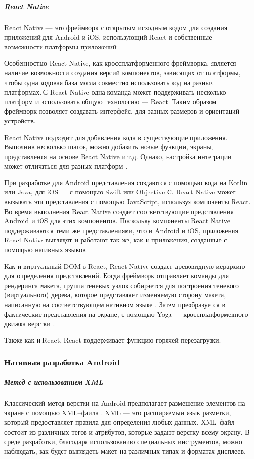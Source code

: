 \subparagraph{React Native} 
\subparagraph{}  

React Native --- это фреймворк с открытым исходным кодом для создания приложений для Android и iOS, использующий React и собственные возможности платформы приложений \cite{react-components}

Особенностью React Native, как кроссплатформенного фреймворка, является наличие возможности создания версий компонентов, зависящих от платформы, чтобы одна кодовая база могла совместно использовать код на разных платформах. С React Native одна команда может поддерживать несколько платформ и использовать общую технологию — React.
Таким образом фреймворк позволяет создавать интерфейс, для разных размеров и ориентаций устройств.

React Native подходит для добавления кода в существующие приложения. 
Выполнив несколько шагов, можно добавить новые функции, экраны, представления на основе React Native и т.д.
Однако, настройка интеграции может отличаться для разных платформ \cite{react-native-integr}. 

При разработке для Android представления создаются с помощью кода на Kotlin или Java, для iOS --- с помощью Swift или Objective-C. 
React Native может вызывать эти представления с помощью JavaScript, используя компоненты React. 
Во время выполнения React Native создает соответствующие представления Android и iOS для этих компонентов. 
Поскольку компоненты React Native поддерживаются теми же представлениями, что и Android и iOS, приложения React Native выглядят и работают так же, как и приложения, созданные с помощью нативных языков. 

Как и виртуальный DOM в React, React Native создает древовидную иерархию для определения представлений.
Когда фреймворк отправляет команды для рендеринга макета, группа теневых узлов собирается для построения теневого (виртуального) дерева, которое представляет изменяемую сторону макета, написанную на соответствующем нативном языке \cite{react-native-render}. 
Затем преобразуется в фактические представления на экране, с помощью Yoga --- кроссплатформенного движка верстки \cite{yoga}.

Также как и React, React поддерживает функцию горячей перезагрузки.
\subparagraph{}  
\subsubsection{Нативная разработка Android} 

\subparagraph{Метод с использованием XML} 
\subparagraph{}  
Классический метод верстки на Android предполагает размещение элементов на экране с помощью XML--файла \cite{xml-android}.
XML --- это расширяемый язык разметки, который предоставляет правила для определения любых данных.
XML--файл состоит из различных тегов и атрибутов, которые задают верстку всему экрану. 
В среде разработки, благодаря использованию специальных инструментов, можно наблюдать, как будет выглядеть макет на различных типах и форматах дисплеев.


